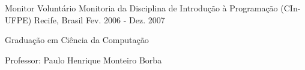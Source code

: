 \begin{cventries}
\cventry
	{Monitor Voluntário}
	{Monitoria da Disciplina de Introdução à Programação (CIn-UFPE)}
	{Recife, Brasil}
	{Fev. 2006 - Dez. 2007}
	{\begin{cvitems}
		\item{Graduação em Ciência da Computação}
		\item{Professor: Paulo Henrique Monteiro Borba}
	\end{cvitems}}

\end{cventries}
